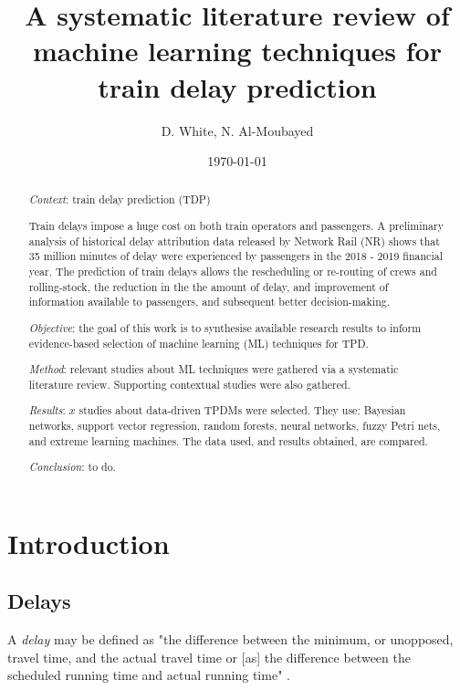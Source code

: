\documentclass{article}
\title{A systematic literature review of machine learning techniques for train delay prediction}
\author{D. White, N. Al-Moubayed}
\date{\today}
\begin{document}
\begin{titlingpage}

\maketitle
\begin{abstract}

\textit{Context}: train delay prediction (TDP) 

Train delays impose a huge cost on both train operators and passengers. A preliminary analysis of historical delay attribution data released by Network Rail (NR) shows that
35 million minutes of delay were experienced by passengers in the 2018 - 2019 financial year. The prediction of train delays allows the rescheduling or re-routing of crews and rolling-stock,
the reduction in the the amount of delay, and improvement of information available to passengers, and subsequent better decision-making. 

\textit{Objective}: the goal of this work is to synthesise available research results to inform evidence-based selection of machine learning (ML) techniques for TPD.

\textit{Method}: relevant studies about ML techniques were gathered via a systematic literature review. Supporting contextual studies were also gathered.

\textit{Results}: $x$ studies about data-driven TPDMs were selected. They use: Bayesian networks, support vector regression, random forests, neural networks, fuzzy Petri nets, and extreme learning machines. 
The data used, and results obtained, are compared. 

\textit{Conclusion}: to do.

\end{abstract}
\end{titlingpage}

\tableofcontents
 
\clearpage

\twocolumn

\section{Introduction}

\subsection{Delays}

A \textit{delay} may be defined as "the difference between the minimum, or unopposed, travel time, and the actual travel time or [as] the difference between the scheduled running time and actual running time" \cite{dingler_koening_sam_christopher_2010}.
\end{document}
